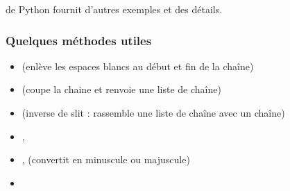 \documentclass[letterpaper,10pt,english]{sphinxhowto}
\begin{document}
\sphinxAtStartPar
{} de Python fournit d’autres exemples et des détails.


\subsubsection{Quelques méthodes utiles}
\label{\detokenize{cours4_chaine_caractere_cours:quelques-methodes-utiles}}\begin{itemize}
\item {} 
\sphinxAtStartPar
{} (enlève les espaces blancs au début et fin de la chaîne)

\item {} 
\sphinxAtStartPar
{} (coupe la chaine et renvoie une liste de chaîne)

\item {} 
\sphinxAtStartPar
{} (inverse de slit : rassemble une liste de chaîne avec un chaîne)

\item {} 
\sphinxAtStartPar
{}, 

\item {} 
\sphinxAtStartPar
{},  (convertit en minuscule ou majuscule)

\item {} 
\sphinxAtStartPar
{}

\end{itemize}

\begin{sphinxVerbatim}[commandchars=\\\{\}]


  \PYG{p}{[}   \PYG{p}{]}
  
\end{sphinxVerbatim}
\end{document}
